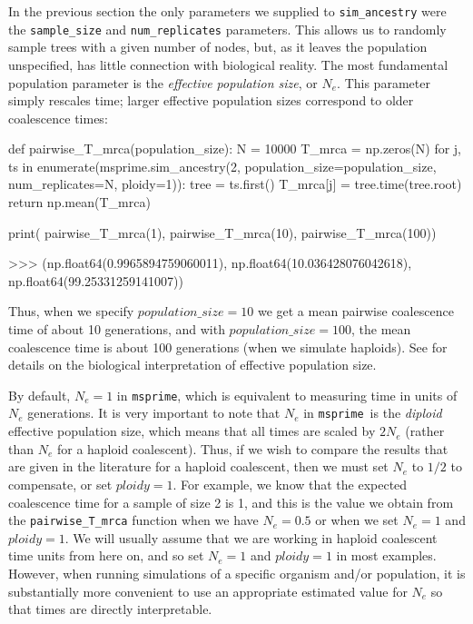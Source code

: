 \documentclass[graybox]{svmult}
\newcommand{\msprime}[0]{\texttt{msprime}}
\begin{document}
In the previous section the only parameters we supplied to
\texttt{sim\_ancestry} were the \texttt{sample\_size} and
\texttt{num\_replicates} parameters. This allows us to randomly sample
trees with a given number of nodes, but, as it leaves the population
unspecified, has little connection with
biological reality. The most fundamental population parameter is the \emph{effective population size}, or
\(N_e\). This parameter simply rescales time; larger effective
population sizes correspond to older coalescence times:

\begin{pythoncode}
def pairwise_T_mrca(population_size):
    N = 10000
    T_mrca = np.zeros(N)
    for j, ts in enumerate(msprime.sim_ancestry(2,
                            population_size=population_size,
                            num_replicates=N, ploidy=1)):
        tree = ts.first()
        T_mrca[j] = tree.time(tree.root)
    return np.mean(T_mrca)

print(
    pairwise_T_mrca(1), pairwise_T_mrca(10),
    pairwise_T_mrca(100))

>>> (np.float64(0.9965894759060011),
     np.float64(10.036428076042618),
     np.float64(99.25331259141007))

\end{pythoncode}

    Thus, when we specify \(population\_size = 10\) we get a mean pairwise coalescence time of about
10 generations, and with \(population\_size = 100\), the mean coalescence time is about
100 generations (when we simulate haploids). See \cite{wakely2008coalescent} for details on the
biological interpretation of effective population size.

By default, \(N_e = 1\) in \msprime, which is equivalent to measuring
time in units of \(N_e\) generations. It is very important to note that
\(N_e\) in \msprime\ is the \emph{diploid} effective population size,
which means that all times are scaled by \(2N_e\) (rather than $N_e$ for a
haploid coalescent). Thus, if we wish to compare the results that are
given in the literature for a haploid coalescent, then we must set
\(N_e\) to $1/2$ to compensate, or set \(ploidy = 1\). For example, we know that the expected
coalescence time for a sample of size 2 is 1, and this is the value we
obtain from the \texttt{pairwise\_T\_mrca} function when we have
\(N_e = 0.5\) or when we set \(N_e = 1\) and \(ploidy = 1\). We will usually assume that we are working in haploid
coalescent time units from here on, and so set \(N_e = 1\) and \(ploidy = 1\) in most
examples. However, when running simulations of a specific organism and/or population, it
is substantially more convenient to use an appropriate estimated value
for \(N_e\) so that times are directly interpretable.
\end{document}
